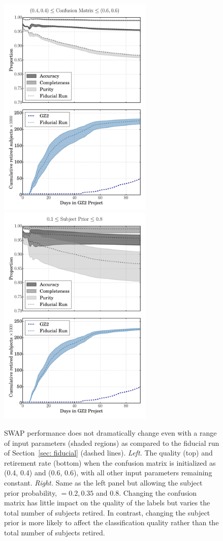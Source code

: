 \begin{figure}[th]
\includegraphics[width=2.9in]{Figures/human_machine/A1a.pdf}
\includegraphics[width=2.9in]{Figures/human_machine/A1b.pdf}
\caption{SWAP performance does not dramatically change even with a range of input parameters (shaded regions) as compared to the fiducial run of Section~\ref{sec: fiducial} (dashed lines).  \textit{Left.} The quality (top) and retirement rate (bottom) when the confusion matrix is initialized as (0.4, 0.4) and (0.6, 0.6), with all other input parameters remaining constant. \textit{Right.} Same as the left panel but allowing the subject prior probability, \p $= 0.2, 0.35$ and $0.8$. Changing the confusion matrix has little impact on the quality of the labels but varies the total number of subjects retired. In contrast, changing the subject prior is more likely to affect the classification quality rather than the total number of subjects retired. \label{fig: tweak swap}}
\end{figure}

